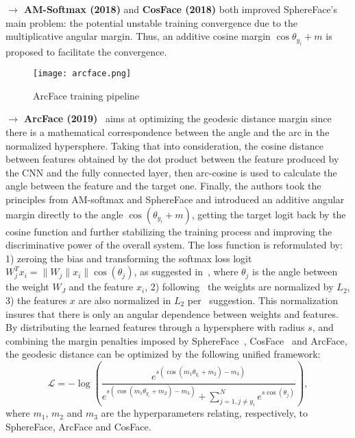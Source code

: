 \documentclass[class=report, crop=false, a4paper, 12pt]{standalone}
\begin{document}
\vspace{0.7\baselineskip}
\noindent\textbf{$\rightarrow$ AM-Softmax (2018)} and \textbf{CosFace (2018)} both improved SphereFace's main problem: the potential unstable training convergence due to the multiplicative angular margin. Thus, an additive cosine margin $\cos{\theta_{y_i}}+m$ is proposed to facilitate the convergence.

\begin{figure}[!h]
    \centering
    \texttt{[image: arcface.png]}
    \caption{ArcFace \autocite{dengArcFaceAdditiveAngular} training pipeline}
    \label{fig:sphereface}
\end{figure}

\vspace{0.7\baselineskip}
\noindent\textbf{$\rightarrow$ ArcFace (2019)}~\autocite{dengArcFaceAdditiveAngular} aims at optimizing the geodesic distance margin since there is a mathematical correspondence between the angle and the arc in the normalized hypersphere. Taking that into consideration, the cosine distance between features obtained by the dot product between the feature produced by the CNN and the fully connected layer, then arc-cosine is used to calculate the angle between the feature and the target one. Finally, the authors took the principles from AM-softmax \autocite{wangAdditiveMarginSoftmax2018} and SphereFace \autocite{liuSphereFaceDeepHypersphere2018} and introduced an additive angular margin directly to the angle $\cos{(\theta_{y_i}+m)}$, getting the target logit back by the cosine function and further stabilizing the training process and improving the discriminative power of the overall system. The loss function is reformulated by: 1) zeroing the bias and transforming the softmax loss logit $W^{T}_{j}x_i=\|W_j\|x_i\|\cos{(\theta_j)}$, as suggested in~\autocite{liuSphereFaceDeepHypersphere2018}, where $\theta_j$ is the angle between the weight $W_J$ and the feature $x_i$, 2) following~\autocite{wangNormFaceL2Hypersphere2017,liuSphereFaceDeepHypersphere2018,wangCosFaceLargeMargin2018} the weights are normalized by $L_2$, 3) the features $x$ are also normalized in $L_2$ per~\autocite{ranjanL2constrainedSoftmaxLoss2017,wangNormFaceL2Hypersphere2017,wangAdditiveMarginSoftmax2018,wangCosFaceLargeMargin2018} suggestion. This normalization insures that there is only an angular dependence between weights and features. By distributing the learned features through a hypersphere with radius $s$, and combining the margin penalties imposed by SphereFace~\autocite{liuSphereFaceDeepHypersphere2018}, CosFace~\autocite{wangCosFaceLargeMargin2018} and ArcFace, the geodesic distance can be optimized by the following unified framework:
\begin{equation}
\mathcal{L}=-\log\left(
                \frac{e^{s(\cos{(m_1\theta_{y_i}+m_2)-m_3})}}
                {e^{s(\cos{(m_1\theta_{y_i}+m_2)-m_3})} + \sum_{j=1, j\neq y_i}^{N}e^{s \cos{(\theta_j)}}}
            \right),
\end{equation}
\noindent where $m_1$, $m_2$ and $m_3$ are the hyperparameters relating, respectively, to SphereFace, ArcFace and CosFace.
\end{document}

